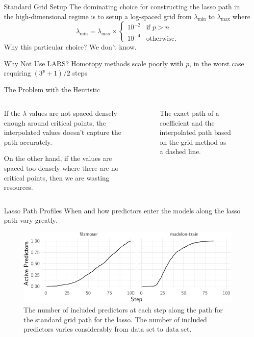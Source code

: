 \documentclass[10pt,ignorenonframetext]{beamer}
\begin{document}
\begin{frame}{Standard Grid Setup}
  The dominating choice for constructing the lasso path in the high-dimensional
  regime is to setup a log-spaced grid from \(\lambda_\text{min}\) to
  \(\lambda_\text{max}\) where
  \[
    \lambda_\text{min} =\lambda_\text{max} \times
    \begin{cases}
      10^{-2} & \text{if } p > n  \\
      10^{-4} & \text{otherwise.}
    \end{cases}
  \]
  Why this particular choice? We don't know.

  \begin{block}{Why Not Use LARS?}
    Homotopy methods scale poorly with \(p\), in the worst case requiring
    \((3^p
    + 1)/2\) steps
  \end{block}
\end{frame}

\begin{frame}{The Problem with the Heuristic}
  \begin{columns}[c]
    \begin{column}{0.45\linewidth}
      If the \(\lambda\) values are not spaced densely enough around critical
      points, the interpolated values doesn't capture the path accurately.

      \medskip

      On the other hand, if the values are spaced too densely where there are
      no critical points, then we are \alert{wasting} resources.
    \end{column}
    \begin{column}{0.45\linewidth}
      \begin{figure}
        \centering
        
        \caption{The exact path of a coefficient and the interpolated path
          based
          on the grid method as a dashed line.}
      \end{figure}
    \end{column}
  \end{columns}
\end{frame}

\begin{frame}{Lasso Path Profiles}
  When and how predictors enter the models along the lasso path vary greatly.
  \begin{figure}
    \includegraphics{figures/grid-paths.pdf}
    \caption{The number of included predictors at each step along the path for
      the
      standard grid path for the lasso. The number of included predictors
      varies
      considerably from data set to data set.\label{fig:grid-paths}}
  \end{figure}
\end{frame}
\end{document}
